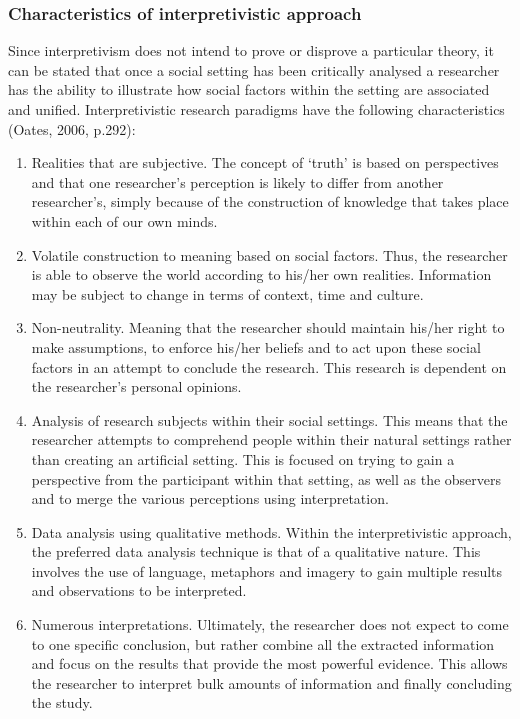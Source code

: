 \subsubsection{Characteristics of interpretivistic approach}
Since interpretivism does not intend to prove or disprove a particular theory, it can be stated that once a social setting has been critically analysed a researcher has the ability to illustrate how social factors within the setting are associated and unified. Interpretivistic research paradigms have the following characteristics (Oates, 2006, p.292): 
\begin{enumerate}[label=\roman*.]
\item Realities that are subjective. The concept of ‘truth’ is based on perspectives and that one researcher's perception is likely to differ from another researcher’s, simply because of the construction of knowledge that takes place within each of our own minds.
\item Volatile construction to meaning based on social factors. Thus, the researcher is able to observe the world according to his/her own realities. Information may be subject to change in terms of context, time and culture.
\item Non-neutrality. Meaning that the researcher should maintain his/her right to make assumptions, to enforce his/her beliefs and to act upon these social factors in an attempt to conclude the research. This research is dependent on the researcher’s personal opinions.
\item Analysis of research subjects within their social settings. This means that the researcher attempts to comprehend people within their natural settings rather than creating an artificial setting. This is focused on trying to gain a perspective from the participant within that setting, as well as the observers and to merge the various perceptions using interpretation.
\item Data analysis using qualitative methods. Within the interpretivistic approach, the preferred data analysis technique is that of a qualitative nature. This involves the use of language, metaphors and imagery to gain multiple results and observations to be interpreted.
\item Numerous interpretations. Ultimately, the researcher does not expect to come to one specific conclusion, but rather combine all the extracted information and focus on the results that provide the most powerful evidence. This allows the researcher to interpret bulk amounts of information and finally concluding the study.
\end{enumerate}

